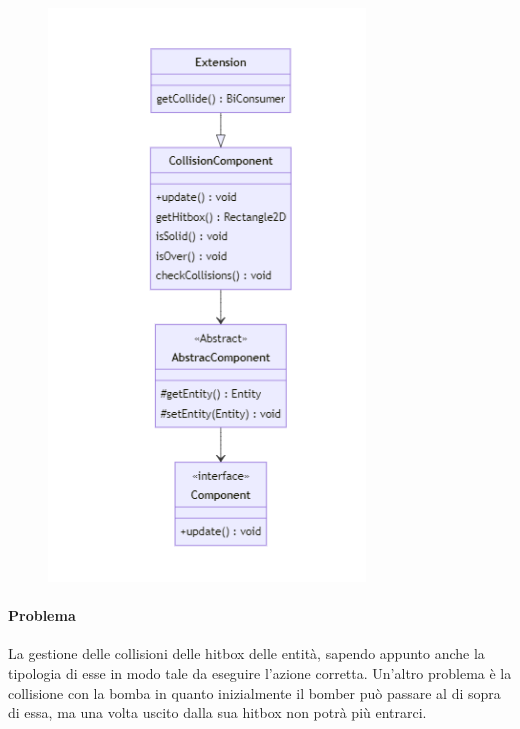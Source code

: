 \documentclass[a4paper,12pt]{report}
\begin{document}
\begin{figure}[H]
    \centering{}
    \includegraphics[width=0.75\textwidth]{img/UMLCollisioni.png}
    \caption{}
\end{figure}

\paragraph{Problema}  La gestione delle collisioni delle hitbox delle entità, sapendo appunto anche la tipologia di esse in modo tale da eseguire l’azione corretta. Un’altro problema è la collisione con la bomba in quanto inizialmente il bomber può passare al di sopra di essa, ma una volta uscito dalla sua hitbox non potrà più entrarci.
\end{document}
